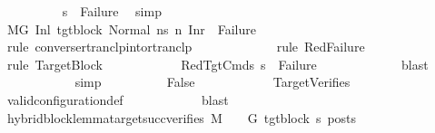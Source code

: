 \begin{isabellebody}
\ \ \ \ \ \ \ \ \isamarkupfalse%
\ {\isachardoublequoteopen}s{}{\isacharprime}{\kern0pt}\ {\isacharequal}{\kern0pt}\ Failure{\isachardoublequoteclose}\ \isamarkupfalse%
\ simp\isanewline
\ \ \ \ \ \ \ \ \isamarkupfalse%
\ {\isachardoublequoteopen}{\isacharparenleft}{\kern0pt}M{\isacharcomma}{\kern0pt}{\isasymLambda}{\isacharcomma}{\kern0pt}{\isasymGamma}{\isacharcomma}{\kern0pt}{\isasymOmega}{\isacharcomma}{\kern0pt}G{\isacharprime}{\kern0pt}\ {\isasymturnstile}{\isacharparenleft}{\kern0pt}Inl\ tgt{\isacharunderscore}{\kern0pt}block{\isacharcomma}{\kern0pt}\ Normal\ ns{\isacharparenright}{\kern0pt}\ {\isacharminus}{\kern0pt}n{\isasymrightarrow}{\isacharasterisk}{\kern0pt}\ {\isacharparenleft}{\kern0pt}Inr\ {\isacharparenleft}{\kern0pt}{\isacharparenright}{\kern0pt}{\isacharcomma}{\kern0pt}\ Failure{\isacharparenright}{\kern0pt}{\isacharparenright}{\kern0pt}{\isachardoublequoteclose}\isanewline
\ \ \ \ \ \ \ \ \ \ \isamarkupfalse%
\ {\isacharparenleft}{\kern0pt}rule\ converse{\isacharunderscore}{\kern0pt}rtranclp{\isacharunderscore}{\kern0pt}into{\isacharunderscore}{\kern0pt}rtranclp{\isacharparenright}{\kern0pt}\isanewline
\ \ \ \ \ \ \ \ \ \ \ \isamarkupfalse%
\ {\isacharparenleft}{\kern0pt}rule\ RedFailure{\isacharparenright}{\kern0pt}\isanewline
\ \ \ \ \ \ \ \ \ \ \ \ \isamarkupfalse%
\ {\isacharparenleft}{\kern0pt}rule\ TargetBlock{\isacharparenright}{\kern0pt}\isanewline
\ \ \ \ \ \ \ \ \ \ \isamarkupfalse%
\ RedTgtCmds\ {\isacartoucheopen}s{}{\isacharprime}{\kern0pt}\ {\isacharequal}{\kern0pt}\ Failure{\isacartoucheclose}\isanewline
\ \ \ \ \ \ \ \ \ \ \ \isamarkupfalse%
\ blast\isanewline
\ \ \ \ \ \ \ \ \ \ \isamarkupfalse%
\ simp\isanewline
\ \ \ \ \ \ \ \ \isamarkupfalse%
\ False\isanewline
\ \ \ \ \ \ \ \ \ \ \isamarkupfalse%
\ TargetVerifies\isanewline
\ \ \ \ \ \ \ \ \ \ \isamarkupfalse%
\ valid{\isacharunderscore}{\kern0pt}configuration{\isacharunderscore}{\kern0pt}def\isanewline
\ \ \ \ \ \ \ \ \ \ \isamarkupfalse%
\ blast\ \ \ \ \ \ \ \ \isanewline
\ \ \ \ \ \ \isamarkupfalse%
\isanewline
\ \ \ \ \ \ \isamarkupfalse%
\ \isamarkupfalse%
\ {\isachardoublequoteopen}hybrid{\isacharunderscore}{\kern0pt}block{\isacharunderscore}{\kern0pt}lemma{\isacharunderscore}{\kern0pt}target{\isacharunderscore}{\kern0pt}succ{\isacharunderscore}{\kern0pt}verifies\ M\ {\isasymLambda}\ {\isasymGamma}\ {\isasymOmega}\ G{\isacharprime}{\kern0pt}\ tgt{\isacharunderscore}{\kern0pt}block\ s{}{\isacharprime}{\kern0pt}\ posts{\isachardoublequoteclose}\isanewline

\end{isabellebody}

